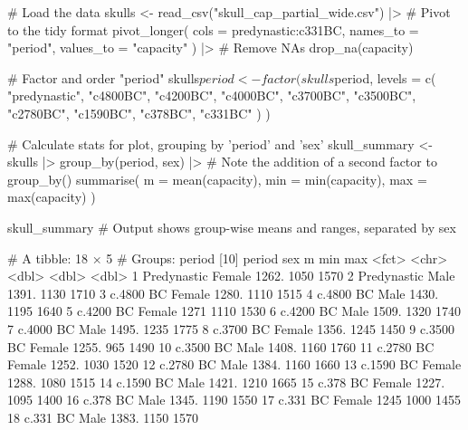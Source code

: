 \begin{inR}
# Load the data
skulls <- read_csv("skull_cap_partial_wide.csv") |>
  # Pivot to the tidy format
  pivot_longer(
    cols = predynastic:c331BC,
    names_to = "period",
    values_to = "capacity"
  ) |>
  # Remove NAs
  drop_na(capacity)
\end{inR}

\begin{inR}
# Factor and order "period"
skulls$period <- factor(skulls$period,
  levels = c(
    "predynastic", "c4800BC", "c4200BC", "c4000BC", "c3700BC",
    "c3500BC",     "c2780BC", "c1590BC", "c378BC",  "c331BC"
  )
)
\end{inR}


\begin{inRhigh}[highlightlines={3}]
# Calculate stats for plot, grouping by 'period' and 'sex'
skull_summary <- skulls |>
  group_by(period, sex) |> # Note the addition of a second factor to group_by()
  summarise(
    m = mean(capacity),
    min = min(capacity),
    max = max(capacity)
  )

skull_summary # Output shows group-wise means and ranges, separated by sex
\end{inRhigh}

\begin{outR}
# A tibble: 18 × 5
# Groups:   period [10]
   period      sex        m   min   max
   <fct>       <chr>  <dbl> <dbl> <dbl>
 1 Predynastic Female 1262.  1050  1570
 2 Predynastic Male   1391.  1130  1710
 3 c.4800 BC   Female 1280.  1110  1515
 4 c.4800 BC   Male   1430.  1195  1640
 5 c.4200 BC   Female 1271   1110  1530
 6 c.4200 BC   Male   1509.  1320  1740
 7 c.4000 BC   Male   1495.  1235  1775
 8 c.3700 BC   Female 1356.  1245  1450
 9 c.3500 BC   Female 1255.   965  1490
10 c.3500 BC   Male   1408.  1160  1760
11 c.2780 BC   Female 1252.  1030  1520
12 c.2780 BC   Male   1384.  1160  1660
13 c.1590 BC   Female 1288.  1080  1515
14 c.1590 BC   Male   1421.  1210  1665
15 c.378 BC    Female 1227.  1095  1400
16 c.378 BC    Male   1345.  1190  1550
17 c.331 BC    Female 1245   1000  1455
18 c.331 BC    Male   1383.  1150  1570
\end{outR}

